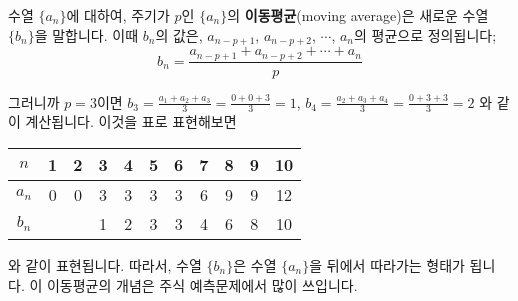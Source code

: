 \documentclass{article}
\begin{document}
\noindent
수열 $\{a_n\}$에 대하여, 주기가 \(p\)인 \(\{a_n\}\)의 \textbf{이동평균}(moving average)은 새로운 수열 $\{b_n\}$을 말합니다.
이때 $b_n$의 값은, \(a_{n-p+1}\), \(a_{n-p+2}\), \(\cdots\), \(a_n\)의 평균으로 정의됩니다;
\[b_n=\frac{a_{n-p+1}+a_{n-p+2}+\cdots+a_n}p\]

\noindent
그러니까 \(p=3\)이면
\(b_3=\frac{a_1+a_2+a_3}3=\frac{0+0+3}3=1\), 
\(b_4=\frac{a_2+a_3+a_4}3=\frac{0+3+3}3=2\)
와 같이 계산됩니다.
이것을 표로 표현해보면

\begin{figure*}[h!]
\centering
\begin{tabular}{c|ccccc ccccc}
$n$		&1&2&3&4&5	&6&7&8&9&10\\\hline
$a_n$	&0&0&3&3&3	&3&6&9&9&12\\	
$b_n$	& & &1&2&3	&3&4&6&8&10\\	
\end{tabular}
\end{figure*}

\noindent
와 같이 표현됩니다.
따라서, 수열 \(\{b_n\}\)은 수열 \(\{a_n\}\)을 뒤에서 따라가는 형태가 됩니다.
이 이동평균의 개념은 주식 예측문제에서 많이 쓰입니다.
\end{document}
